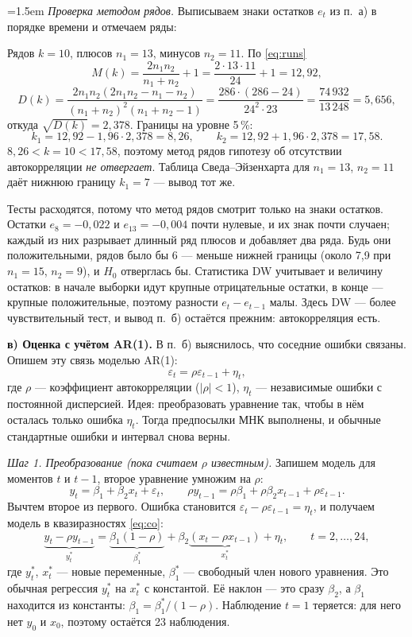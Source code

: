 \begin{solution}
\dwvisual

\smallskip
\noindent\begin{minipage}{\linewidth}
\parindent=1.5em
\emph{Проверка методом рядов.} Выписываем знаки остатков $e_t$ из п.~а) в
порядке времени и отмечаем ряды:

\runsvisual
\end{minipage}
Рядов $k = 10$, плюсов $n_1 = 13$, минусов $n_2 = 11$. По \eqref{eq:runs}
\[
  M(k) = \frac{2n_1n_2}{n_1 + n_2} + 1 = \frac{2\cdot 13\cdot 11}{24} + 1 = 12{,}92,
\]
\[
  D(k) = \frac{2n_1n_2(2n_1n_2 - n_1 - n_2)}{(n_1 + n_2)^2(n_1 + n_2 - 1)}
       = \frac{286\cdot(286 - 24)}{24^2\cdot 23} = \frac{74\,932}{13\,248} = 5{,}656,
\]
откуда $\sqrt{D(k)} = 2{,}378$.
Границы на уровне 5\,\%:
\[
  k_1 = 12{,}92 - 1{,}96\cdot 2{,}378 = 8{,}26,
  \qquad
  k_2 = 12{,}92 + 1{,}96\cdot 2{,}378 = 17{,}58 .
\]
$8{,}26 < k = 10 < 17{,}58$, поэтому метод рядов гипотезу об отсутствии
автокорреляции \emph{не отвергает}. Таблица Сведа--Эйзенхарта для
$n_1 = 13$, $n_2 = 11$ даёт нижнюю границу $k_1 = 7$ — вывод тот же.

Тесты расходятся, потому что метод рядов смотрит только на знаки остатков.
Остатки $e_8 = -0{,}022$ и $e_{13} = -0{,}004$ почти нулевые, и их знак
почти случаен; каждый из них разрывает длинный ряд плюсов и добавляет два
ряда. Будь они положительными, рядов было бы 6 — меньше нижней границы
(около 7,9 при $n_1 = 15$, $n_2 = 9$), и $H_0$ отверглась бы. Статистика DW
учитывает и величину остатков: в начале выборки идут крупные отрицательные
остатки, в конце — крупные положительные, поэтому разности $e_t - e_{t-1}$
малы. Здесь DW — более чувствительный тест, и вывод п.~б) остаётся прежним:
автокорреляция есть.

\medskip
\textbf{в) Оценка с учётом AR(1).} В п.~б) выяснилось, что соседние ошибки
связаны. Опишем эту связь моделью AR(1):
\[
  \varepsilon_t = \rho\varepsilon_{t-1} + \eta_t ,
\]
где $\rho$ — коэффициент автокорреляции ($|\rho| < 1$), $\eta_t$ —
независимые ошибки с постоянной дисперсией. Идея: преобразовать уравнение
так, чтобы в нём осталась только ошибка $\eta_t$. Тогда предпосылки МНК
выполнены, и обычные стандартные ошибки и интервал снова верны.

\smallskip
\emph{Шаг 1. Преобразование (пока считаем $\rho$ известным).} Запишем модель
для моментов $t$ и $t-1$, второе уравнение умножим на $\rho$:
\[
  y_t = \beta_1 + \beta_2x_t + \varepsilon_t ,
  \qquad
  \rho y_{t-1} = \rho\beta_1 + \rho\beta_2x_{t-1} + \rho\varepsilon_{t-1} .
\]
Вычтем второе из первого. Ошибка становится
$\varepsilon_t - \rho\varepsilon_{t-1} = \eta_t$, и получаем модель в
квазиразностях \eqref{eq:co}:
\[
  {\underbrace{y_t - \rho y_{t-1}}_{y_t^*}}
  = {\underbrace{\beta_1(1 - \rho)}_{\beta_1^*}}
  + \beta_2{\underbrace{(x_t - \rho x_{t-1})}_{x_t^*}} + \eta_t,
  \qquad t = 2, \dots, 24 ,
\]
где $y_t^*$, $x_t^*$ — новые переменные, $\beta_1^*$ — свободный член
нового уравнения. Это обычная регрессия $y_t^*$ на $x_t^*$ с константой.
Её наклон — это сразу $\beta_2$, а $\beta_1$ находится из константы:
$\beta_1 = \beta_1^*/(1 - \rho)$. Наблюдение $t = 1$ теряется: для него нет
$y_0$ и $x_0$, поэтому остаётся 23 наблюдения.


\end{solution}
